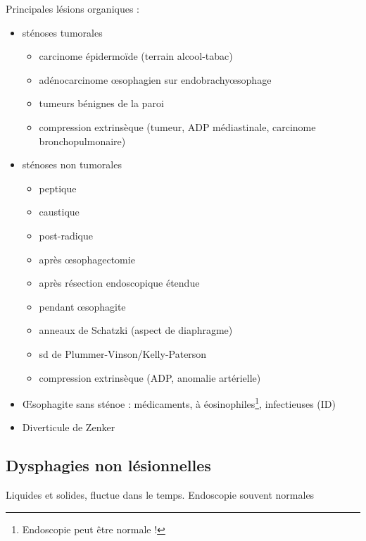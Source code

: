 \documentclass[11pt]{article}
\begin{document}
Principales lésions organiques :
\begin{itemize}
\item sténoses tumorales
\begin{itemize}
\item carcinome épidermoïde (terrain alcool-tabac)
\item adénocarcinome \oe{}sophagien sur endobrachy\oe{}sophage
\item tumeurs bénignes de la paroi
\item compression extrinsèque (tumeur, ADP médiastinale, carcinome bronchopulmonaire)
\end{itemize}
\item sténoses non tumorales
\begin{itemize}
\item peptique
\item caustique
\item post-radique
\item après \oe{}sophagectomie
\item après résection endoscopique étendue
\item pendant \oe{}sophagite
\item anneaux de Schatzki (aspect de diaphragme)
\item sd de Plummer-Vinson/Kelly-Paterson
\item compression extrinsèque (ADP, anomalie artérielle)
\end{itemize}
\item \OE{}sophagite sans sténoe : médicaments, à éosinophiles\footnote{Endoscopie peut être normale !}, infectieuses
(ID)
\item Diverticule de Zenker
\end{itemize}


\subsection{Dysphagies non lésionnelles}
\label{sec:org8f6011b}
Liquides et solides, fluctue dans le temps. Endoscopie souvent normales
\end{document}
